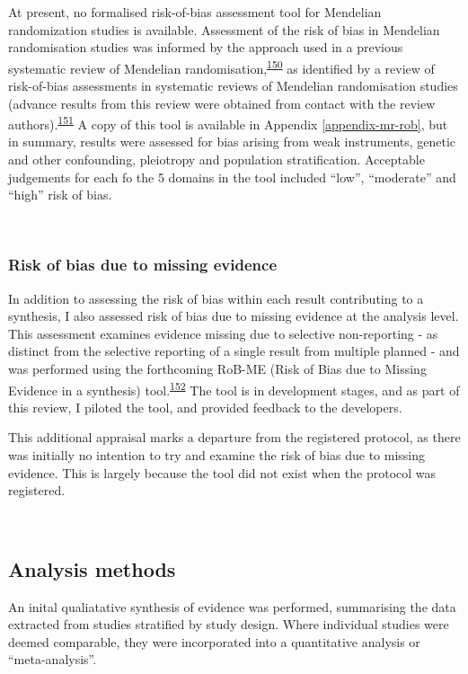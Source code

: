 \documentclass[a4paper, twoside]{templates/ociamthesis}
\begin{document}
At present, no formalised risk-of-bias assessment tool for Mendelian randomization studies is available. Assessment of the risk of bias in Mendelian randomisation studies was informed by the approach used in a previous systematic review of Mendelian randomisation,\textsuperscript{\protect\hyperlink{ref-mamluk2020}{150}} as identified by a review of risk-of-bias assessments in systematic reviews of Mendelian randomisation studies (advance results from this review were obtained from contact with the review authors).\textsuperscript{\protect\hyperlink{ref-spiga2021}{151}} A copy of this tool is available in Appendix \ref{appendix-mr-rob}, but in summary, results were assessed for bias arising from weak instruments, genetic and other confounding, pleiotropy and population stratification. Acceptable judgements for each fo the 5 domains in the tool included ``low'', ``moderate'' and ``high'' risk of bias.

~

\hypertarget{methods-rob-me}{%
\subsubsection{Risk of bias due to missing evidence}\label{methods-rob-me}}

In addition to assessing the risk of bias within each result contributing to a synthesis, I also assessed risk of bias due to missing evidence at the analysis level. This assessment examines evidence missing due to selective non-reporting - as distinct from the selective reporting of a single result from multiple planned - and was performed using the forthcoming RoB-ME (Risk of Bias due to Missing Evidence in a synthesis) tool.\textsuperscript{\protect\hyperlink{ref-zotero-15123}{152}} The tool is in development stages, and as part of this review, I piloted the tool, and provided feedback to the developers.

This additional appraisal marks a departure from the registered protocol, as there was initially no intention to try and examine the risk of bias due to missing evidence. This is largely because the tool did not exist when the protocol was registered.

~

\hypertarget{analysis-methods}{%
\subsection{Analysis methods}\label{analysis-methods}}

An inital qualiatative synthesis of evidence was performed, summarising the data extracted from studies stratified by study design. Where individual studies were deemed comparable, they were incorporated into a quantitative analysis or ``meta-analysis''.
\end{document}
